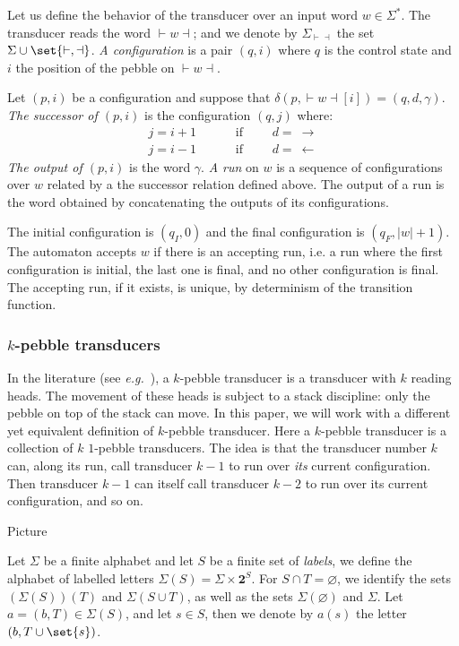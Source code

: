 Let us define the behavior of the transducer over an input word $w\in\Sigma^*$. The transducer reads the word ${\vdash} w{\dashv}$; and we denote by $\Sigma_{\vdash\dashv}$ the set  $\Sigma\cup\set{\vdash,\dashv}$. \emph{A configuration} is a pair $(q,i)$ where $q$ is the control state and $i$ the position of the pebble on ${\vdash} w{\dashv}$. 

Let $(p,i)$ be a configuration and suppose that $\delta(p, {\vdash} w{\dashv}[i])=(q,d,\gamma)$. \emph{The successor of $(p,i)$} is the configuration $(q,j)$
where:
\begin{align*}
 j=i+1 &\qquad \text{ if }\qquad d=\ \rightarrow\\
 j=i-1 &\qquad \text{ if }\qquad d=\ \leftarrow 
\end{align*}
\emph{The output of $(p,i)$} is the word $\gamma$. \emph{A run} on $w$ is a sequence of configurations over $w$ related by a the successor relation defined above. The output of a run is the word obtained by concatenating the outputs of its configurations.


The initial configuration is $(q_I, 0)$ and the final configuration is $(q_F,|w|+1)$. The automaton accepts $w$ if there is an accepting run,
i.e. a run where the first configuration is initial, the last one is final, and no other configuration is final. The accepting run, if it exists, is unique, by determinism of the transition function.


\subsubsection{$k$-pebble transducers}

In the literature (see \textit{e.g.}~\cite{Bojanczyk18}), a $k$-pebble transducer is a transducer with $k$ reading heads. The movement of these heads is subject to a stack discipline: only the pebble on top of the stack can move.
In this paper, we will work with a different yet equivalent definition of $k$-pebble transducer. Here a $k$-pebble transducer is a collection of $k$ $1$-pebble transducers. The idea is that the transducer number $k$ can, along its run, call transducer $k-1$ to run over \emph{its} current configuration. Then transducer $k-1$ can itself call transducer $k-2$ to run over its current configuration, and so on.
\begin{center}
Picture
\end{center}
Let $\Sigma$ be a finite alphabet and let $S$ be a finite set of \emph{labels}, we define the alphabet of labelled letters $\Sigma(S)=\Sigma\times \mathbf 2^S$. For $S\cap T=\varnothing$, we identify the sets $(\Sigma(S))(T)$ and $\Sigma(S\cup T)$, as well as the sets $\Sigma(\varnothing)$ and $\Sigma$.
Let $a=(b,T)\in \Sigma(S)$, and let $s\in S$, then we denote by  $a(s)$ the letter $(b,T\cup\set{s})$.

